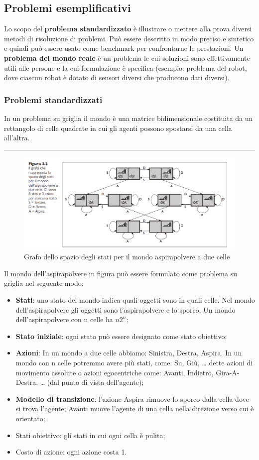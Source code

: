 \documentclass{article}
\begin{document}
\newpage
\subsection{Problemi esemplificativi}
Lo scopo del \textbf{problema standardizzato} è illustrare o mettere alla prova diversi metodi di risoluzione di problemi. Può essere descritto in modo preciso e sintetico e quindi può essere usato come benchmark per confrontarne le prestazioni. Un \textbf{problema del mondo reale} è un problema le cui soluzioni sono effettivamente utili alle persone e la cui formulazione è specifica (esempio: problema del robot, dove ciascun robot è dotato di sensori diversi che producono dati diversi).
\newpage
\subsubsection{Problemi standardizzati}
In un problema su griglia il mondo è una matrice bidimensionale costituita da un rettangolo di celle quadrate in cui gli agenti possono spostarsi da una cella all'altra.
\par\noindent\rule{\textwidth}{0.4pt}
\begin{figure}[H]
    \centering
    \includegraphics[width=0.5\linewidth]{Images/grafoSpazioStatiAspirapolvere.png}
    \caption{Grafo dello spazio degli stati per il mondo aspirapolvere a due celle}
    \label{fig:enter-label}
\end{figure}
Il mondo dell'aspirapolvere in figura può essere formulato come problema su griglia nel seguente modo:
\begin{itemize}
    \item \textbf{Stati}: uno stato del mondo indica quali oggetti sono in quali celle. Nel mondo dell'aspirapolvere gli oggetti sono l'aspirapolvere e lo sporco. Un mondo dell'aspirapolvere con n celle ha $n2^n$;
    \item \textbf{Stato iniziale}: ogni stato può essere designato come stato obiettivo;
    \item \textbf{Azioni}: In un mondo a due celle abbiamo: Sinistra, Destra, Aspira. In un mondo con n celle potremmo avere più stati, come: Su, Giù, … dette azioni di movimento assolute o azioni egocentriche come: Avanti, Indietro, Gira-A-Destra, … (dal punto di vista dell'agente);
    \item \textbf{Modello di transizione}: l'azione Aspira rimuove lo sporco dalla cella dove si trova l'agente; Avanti muove l'agente di una cella nella direzione verso cui è orientato;
    \item Stati obiettivo: gli stati in cui ogni cella è pulita;
    \item Costo di azione: ogni azione costa 1.
\end{itemize}
\end{document}
